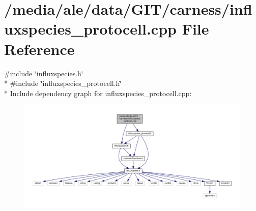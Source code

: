\hypertarget{a00037}{\section{/media/ale/data/\-G\-I\-T/carness/influxspecies\-\_\-protocell.cpp File Reference}
\label{a00037}
}
{\ttfamily \#include \char`\"{}influxspecies.\-h\char`\"{}}\\*
{\ttfamily \#include \char`\"{}influxspecies\-\_\-protocell.\-h\char`\"{}}\\*
Include dependency graph for influxspecies\-\_\-protocell.\-cpp\-:\nopagebreak
\begin{figure}[H]
\begin{center}
\leavevmode
\includegraphics[width=350pt]{a00070}
\end{center}
\end{figure}
